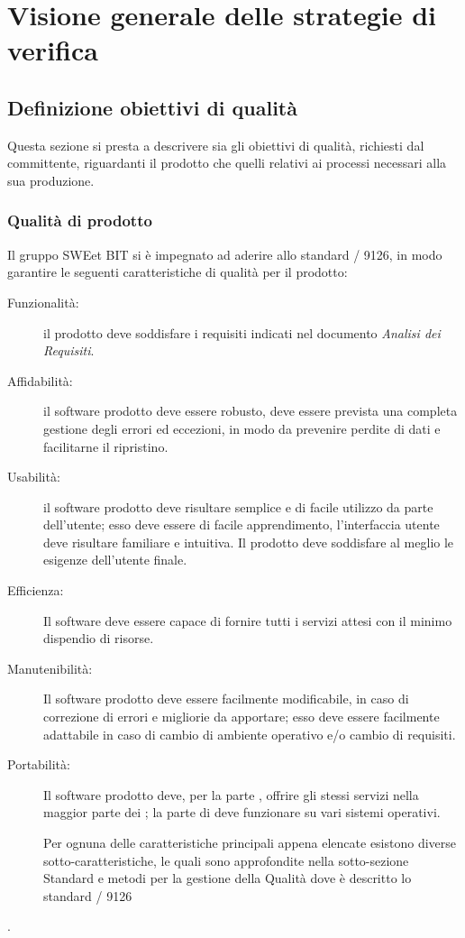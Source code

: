 \section{Visione generale delle strategie di verifica}
  \subsection{Definizione obiettivi di qualità}
  Questa sezione si presta a descrivere sia gli obiettivi di qualità, richiesti dal committente, riguardanti il prodotto
  che quelli relativi ai processi necessari alla sua produzione.
    \subsubsection{Qualità di prodotto}
    Il gruppo SWEet BIT si è impegnato ad aderire allo standard / 9126, in modo garantire
    le seguenti caratteristiche di qualità per il prodotto:
    \begin{description}
      \item [Funzionalità:] il prodotto deve soddisfare i requisiti indicati nel documento \emph{Analisi dei Requisiti}.

      \item [Affidabilità:] il software prodotto deve essere robusto, deve essere prevista una completa gestione degli errori ed eccezioni,
       in modo da prevenire perdite di dati e facilitarne il ripristino.

      \item [Usabilità:] il software prodotto deve risultare semplice e di facile utilizzo da parte dell'utente; esso deve essere di facile apprendimento,
      l'interfaccia utente deve risultare familiare e intuitiva. Il prodotto deve soddisfare al meglio le esigenze dell'utente finale.

      \item [Efficienza:] Il software deve essere capace di fornire tutti i servizi attesi con il minimo dispendio di risorse.

      \item [Manutenibilità:] Il software prodotto deve essere facilmente modificabile, in caso di correzione di errori e migliorie da apportare; esso deve essere facilmente
      adattabile in caso di cambio di ambiente operativo e/o cambio di requisiti.

      \item [Portabilità:] Il software prodotto deve, per la parte , offrire gli stessi servizi nella maggior parte dei ;
      la parte di  deve funzionare su vari sistemi operativi.

    Per ognuna delle caratteristiche principali appena elencate esistono diverse sotto-caratteristiche,
    le quali sono approfondite nella sotto-sezione Standard e metodi per la gestione della Qualità dove è descritto lo standard / 9126
    \end{description}.

